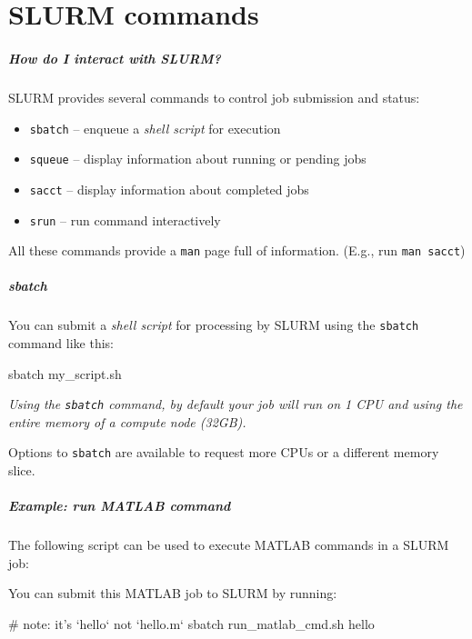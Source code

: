\documentclass[english,serif,mathserif,usenames,dvipsnames]{beamer}
\begin{document}
\part{SLURM commands}
\begin{frame}
  \frametitle{How do I interact with SLURM?}

  SLURM provides several commands to control job submission and
  status:
  \begin{itemize}
  \item \texttt{sbatch} -- enqueue a \emph{shell script} for execution
  \item \texttt{squeue} -- display information about running or pending jobs
  \item \texttt{sacct} -- display information about completed jobs
  \item \texttt{srun} -- run command interactively
  \end{itemize}

  \+
  All these commands provide a \texttt{man} page full of information.
  (E.g., run \texttt{man sacct})
\end{frame}


\begin{frame}[fragile]
  \frametitle{sbatch}

  You can submit a \emph{shell script} for processing by SLURM using
  the \texttt{sbatch} command like this:

\begin{sh}
  sbatch my_script.sh
\end{sh}

\+
  {\em Using the \texttt{sbatch} command, by default your job will run on 1
  CPU and using the entire memory of a compute node (32GB).}

\+
  Options to \texttt{sbatch} are available to request more CPUs or a
  different memory slice.
\end{frame}


\begin{frame}[fragile]
  \frametitle{Example: run MATLAB command}

  The following script can be used to execute MATLAB commands in a SLURM job:
  

  \+
  You can submit this MATLAB job to SLURM by running:

\begin{sh}
    # note: it's `hello` not `hello.m`
    sbatch run_matlab_cmd.sh hello
\end{sh}
\end{frame}
\end{document}

